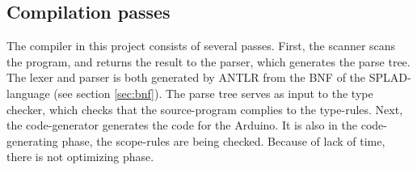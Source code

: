 \subsection{Compilation passes}
The compiler in this project consists of several passes. First, the scanner scans the program, and returns the result to the parser, which generates the parse tree. The lexer and parser is both generated by ANTLR \citep{ANTLR} from the BNF of the SPLAD-language (see section \ref{sec:bnf}). The parse tree serves as input to the type checker, which checks that the source-program complies to the type-rules. Next, the code-generator generates the code for the Arduino. It is also in the code-generating phase, the scope-rules are being checked. Because of lack of time, there is not optimizing phase. 
